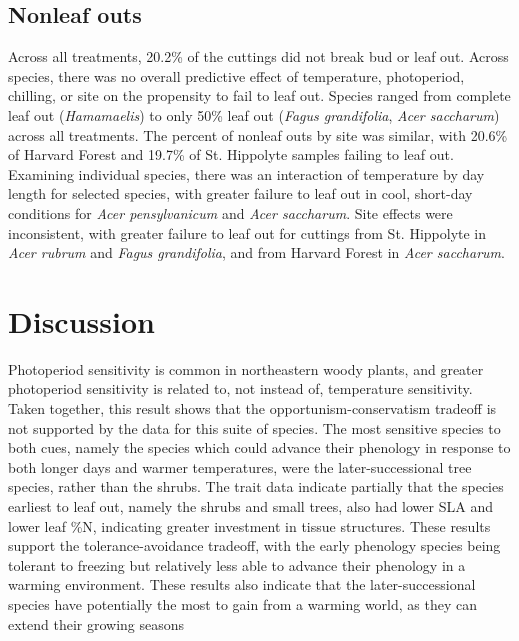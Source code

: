 \documentclass[11pt]{article}
\begin{document}
\subsection*{Nonleaf outs}

Across all treatments, 20.2\% of the cuttings did not break bud or leaf out. Across species, there was no overall predictive effect of temperature, photoperiod, chilling, or site on the propensity to fail to leaf out. Species ranged from complete leaf out (\emph{Hamamaelis}) to only 50\% leaf out (\emph{Fagus grandifolia}, \emph{Acer saccharum}) across all treatments. The percent of nonleaf outs by site was similar, with 20.6\% of Harvard Forest and 19.7\% of St. Hippolyte samples failing to leaf out. Examining individual species,  there was an interaction of temperature by day length for selected species, with greater failure to leaf out in cool, short-day conditions for \emph{Acer pensylvanicum}  and \emph{Acer saccharum}. Site effects were inconsistent, with greater failure to leaf out for cuttings from St. Hippolyte in \emph{Acer rubrum} and \emph{Fagus grandifolia}, and from Harvard Forest in \emph{Acer saccharum}. 


\section*{Discussion}

Photoperiod sensitivity is common in northeastern woody plants, and greater photoperiod sensitivity is related to, not instead of, temperature sensitivity. Taken together, this result shows that the opportunism-conservatism tradeoff is not supported by the data for this suite of species. The most sensitive species to both cues, namely the species which could advance their phenology in response to both longer days and warmer temperatures, were the later-successional tree species, rather than the shrubs. The trait data indicate partially that the species earliest to leaf out, namely the shrubs and small trees, also had lower SLA and lower leaf \%N, indicating greater investment in tissue structures. These results support the tolerance-avoidance tradeoff, with the early phenology species being tolerant to freezing but relatively less able to advance their phenology in a warming environment. These results also indicate that the later-successional species have potentially the most to gain from a warming world, as they can extend their growing seasons  
\end{document}
